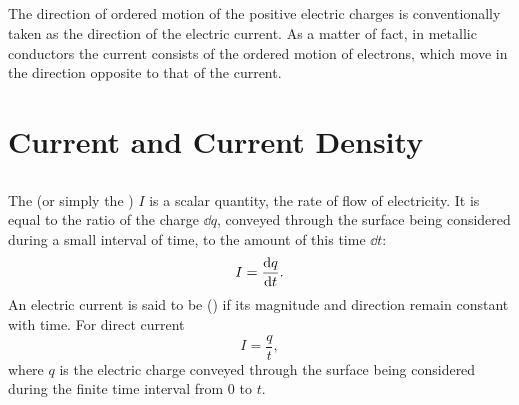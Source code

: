 \subsection{}\label{20.1.5} The direction of ordered motion of the positive electric charges is conventionally taken as the direction of the electric current. As a matter of fact, in metallic conductors the current consists of the ordered motion of electrons, which move in the direction opposite to that of the current.

\section{Current and Current Density}
\label{sec-20.2}

\subsection{}\label{20.2.1} The  (or simply the ) $I$ is a scalar quantity, the rate of flow of electricity. It is equal to the ratio of the charge $\dd q$, conveyed through the surface being considered during a small interval of time, to the amount of this time $\dd t$:
\begin{equation*}%
I = \dv{q}{t}.
\end{equation*}
An electric current is said to be  () if its magnitude and direction remain constant with time. For direct current
\begin{equation*}%
I = \frac{q}{t},
\end{equation*}
where $q$ is the electric charge conveyed through the surface being considered during the finite time interval from 0 to $t$. 

